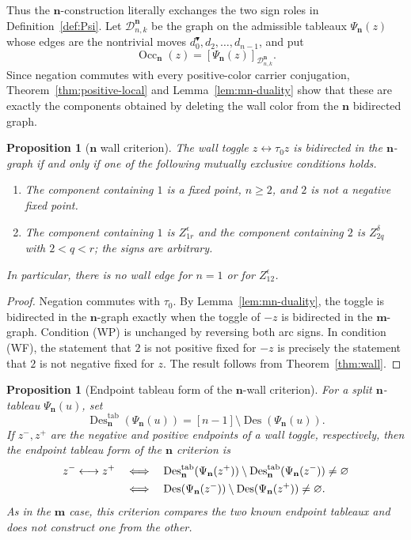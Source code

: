 \documentclass[11pt]{article}
\newtheorem{proposition}[theorem]{Proposition}
\theoremstyle{definition}
\theoremstyle{remark}
\newcommand{\Des}{\operatorname{Des}}
\newcommand{\Occ}{\operatorname{Occ}}
\newcommand{\cD}{\mathcal D}
\newcommand{\mgraph}{\mathbf m}
\newcommand{\ngraph}{\mathbf n}
\begin{document}
Thus the $\ngraph$-construction literally exchanges the two sign roles in
Definition~\ref{def:Psi}.  Let $\cD^{\ngraph}_{n,k}$ be the graph on the
admissible tableaux $\Psi_{\ngraph}(z)$ whose edges are the nontrivial
moves $d_0^{\blacktriangledown},d_2,\ldots,d_{n-1}$, and put
\[
 \Occ_{\ngraph}(z)
   =[\Psi_{\ngraph}(z)]_{\cD^{\ngraph}_{n,k}}.
\]
Since negation commutes with every positive-color carrier conjugation,
Theorem~\ref{thm:positive-local} and Lemma~\ref{lem:mn-duality} show that
these are exactly the components obtained by deleting the wall color
from the $\ngraph$ bidirected graph.

\begin{proposition}[$\ngraph$ wall criterion]
\label{prop:n-wall}
The wall toggle $z\leftrightarrow\tau_0z$ is bidirected in the
$\ngraph$-graph if and only if one of the following mutually exclusive
conditions holds.
\begin{enumerate}[leftmargin=3.2em]
\item[\textup{(NF)}]
The component containing $1$ is a fixed point, $n\geq2$, and $2$ is not
a negative fixed point.
\item[\textup{(NP)}]
The component containing $1$ is $Z_{1r}^{\epsilon}$ and the component
containing $2$ is $Z_{2q}^{\delta}$ with $2<q<r$; the signs are arbitrary.
\end{enumerate}
In particular, there is no wall edge for $n=1$ or for
$Z_{12}^{\epsilon}$.
\end{proposition}

\begin{proof}
Negation commutes with $\tau_0$.  By Lemma~\ref{lem:mn-duality}, the
toggle is bidirected in the $\ngraph$-graph exactly when the toggle of
$-z$ is bidirected in the $\mgraph$-graph.  Condition \textup{(WP)} is
unchanged by reversing both arc signs.  In condition \textup{(WF)}, the
statement that $2$ is not positive fixed for $-z$ is precisely the
statement that $2$ is not negative fixed for $z$.  The result follows
from Theorem~\ref{thm:wall}.
\end{proof}

\begin{proposition}[Endpoint tableau form of the $\ngraph$-wall criterion]
\label{prop:n-tableau-wall-criterion}
For a split $\ngraph$-tableau $\Psi_{\ngraph}(u)$, set
\[
 \Des_{\ngraph}^{\mathrm{tab}}(\Psi_{\ngraph}(u))
   =[n-1]\setminus\Des(\Psi_{\ngraph}(u)).
\]
If $z^-,z^+$ are the negative and positive endpoints of a wall toggle,
respectively, then the endpoint tableau form of the $\ngraph$ criterion is
\begin{align}
 z^-\longleftrightarrow z^+
 &\quad\Longleftrightarrow\quad
 \Des_{\ngraph}^{\mathrm{tab}}(\Psi_{\ngraph}(z^+))
 \setminus
 \Des_{\ngraph}^{\mathrm{tab}}(\Psi_{\ngraph}(z^-))
 \ne\varnothing \notag\\
 &\quad\Longleftrightarrow\quad
 \Des(\Psi_{\ngraph}(z^-))
 \setminus\Des(\Psi_{\ngraph}(z^+))\ne\varnothing.
 \label{eq:n-tableau-wall-criterion}
\end{align}
As in the $\mgraph$ case, this criterion compares the two known endpoint
tableaux and does not construct one from the other.
\end{proposition}
\end{document}
